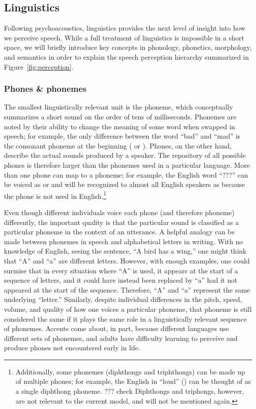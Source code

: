 \subsection{Linguistics}

Following psychoacoustics,
linguistics provides
the next level of insight into
how we perceive speech.
While a full treatment of linguistics
is impossible in a short space,
we will briefly introduce
key concepts in phonology,
phonetics, morphology, and semantics
in order to
explain the speech perception hierarchy
summarized in Figure~\ref{fig:perception}.


\subsubsection{Phones \& phonemes}

The smallest linguistically relevant unit
is the phoneme, which conceptually
summarizes a short sound
on the order of tens of milliseconds.
Phonemes are noted by their ability
to change the meaning of some word
when swapped in speech;
for example, the only difference between
the word ``bad'' and ``mad'' is the
consonant phoneme
at the beginning
( or ).
Phones, on the other hand,
describe the actual sounds
produced by a speaker.
The repository of all possible phones
is therefore larger than the phonemes
used in a particular language.
More than one phone can map
to a phoneme;
for example, the English word
``???'' can be voiced as
\ipa{[???]} or \ipa{[???]}
and will be recognized to
almost all English speakers
as  because
the \ipa{[???]} phone
is not used in English.\footnote{
  Additionally, some phonemes
  (diphthongs and triphthongs)
  can be made up of multiple phones;
  for example, the English \ipa{[aU]}
  in ``loud'' (\ipa{[laUd]})
  can be thought of as a single
  diphthong phoneme. ??? check
  Diphthongs and triphongs, however,
  are not relevant to the current model,
  and will not be mentioned again.}

Even though different individuals
voice each phone
(and therefore phoneme) differently,
the important quality is that
the particular sound is classified
as a particular phoneme
in the context of an utterance.
A helpful analogy can be made between
phonemes in speech
and alphabetical letters in writing.
With no knowledge of English,
seeing the sentence,
``A bird has a wing,''
one might think that ``A'' and ``a''
are different letters.
However, with enough examples,
one could surmise that in every situation
where ``A'' is used, it appears at the
start of a sequence of letters,
and it could have instead
been replaced by ``a''
had it not appeared at the start of the sequence.
Therefore, ``A'' and ``a'' represent
the same underlying ``letter.''
Similarly, despite individual differences
in the pitch, speed, volume, and quality
of how one voices a particular phoneme,
that phoneme is still considered the same
if it plays the same role
in a linguistically relevant sequence of phonemes.
Accents come about, in part,
because different languages use different
sets of phonemes,
and adults have difficulty
learning to perceive and produce
phones not encountered early in life.

